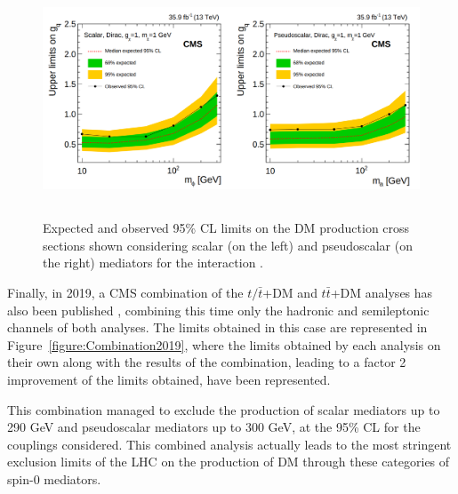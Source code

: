 \documentclass[a4paper, 10pt, openright]{report}
\begin{document}
\begin{figure}[htbp]
\begin{center}
\includegraphics[width=15.4cm, height=7cm]{figs/CMSttbarExclusion.png}
\caption{Expected and observed 95\% \ac{CL} limits on the \ac{DM} production cross sections shown considering scalar (on the left) and pseudoscalar (on the right) mediators for the interaction \cite{PreviousDoubleTopAllLep13CMS}.}
\label{figure:CMSttbarExclusion}
\end{center}
\end{figure}

Finally, in 2019, a \ac{CMS} combination of the $t/\bar t$+DM and $t \bar t$+DM analyses has also been published \cite{PreviousSingleDoubleTopAllLep13CMS}, combining this time only the hadronic and semileptonic channels of both analyses. The limits obtained in this case are represented in Figure~\ref{figure:Combination2019}, where the limits obtained by each analysis on their own along with the results of the combination, leading to a factor 2 improvement of the limits obtained, have been represented. 

This combination managed to exclude the production of scalar mediators up to 290 GeV and pseudoscalar mediators up to 300 GeV, at the 95\% \ac{CL} for the couplings considered. This combined analysis actually leads to the most stringent exclusion limits of the \ac{LHC} on the production of \ac{DM} through these categories of spin-0 mediators.
\end{document}
